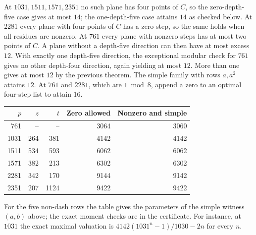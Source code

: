 \documentclass[11pt]{article}
\begin{document}
At $1031,1511,1571,2351$ no such plane has four points of $C$,
so the zero-depth-five case gives at most $14$; the one-depth-five
case attains $14$ as checked below. At $2281$ every plane with four
points of $C$ has a zero step, so the same holds when all residues
are nonzero. At $761$ every plane with nonzero steps has at most two
points of $C$. A plane without a depth-five direction can then have
at most excess $12$. With exactly one depth-five direction, the
exceptional modular check for $761$ gives no other depth-four
direction, again yielding at most $12$. More than one gives at
most $12$ by the previous theorem. The simple family with rows
$a,a^2$ attains $12$. At $761$ and $2281$, which are $1\bmod8$,
append a zero to an optimal four-step list to attain $16$.
\begin{center}
\begin{tabular}{rrrrr}
\toprule
$p$ & $z$ & $t$ & Zero allowed & Nonzero and simple\\
\midrule
761  & --  & --   & 3064 & 3060\\
1031 & 264 & 381  & 4142 & 4142\\
1511 & 534 & 593  & 6062 & 6062\\
1571 & 382 & 213  & 6302 & 6302\\
2281 & 342 & 170  & 9144 & 9142\\
2351 & 207 & 1124 & 9422 & 9422\\
\bottomrule
\end{tabular}
\end{center}
For the five non-dash rows the table gives the parameters of the
simple witness $(a,b)$ above; the exact moment checks are in the
certificate. For instance, at $1031$ the exact maximal valuation
is $4142(1031^n-1)/1030-2n$ for every $n$.
\end{document}
